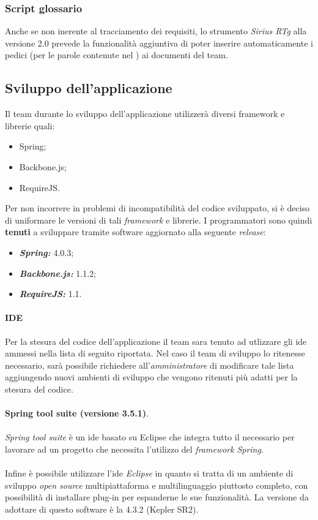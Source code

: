 \subsubsection{Script glossario}
Anche se non inerente al tracciamento dei requisiti, lo strumento \textit{Sirius RTg} alla versione 2.0 prevede la funzionalità aggiuntiva di poter inserire automaticamente i pedici  (per le parole contenute nel \Glossario{}) ai documenti del team.
\subsection{Sviluppo dell'applicazione}
Il team \gruppo{} durante lo sviluppo dell'applicazione utilizzerà diversi framework e librerie quali:

\begin{itemize}
\item Spring;
\item Backbone.js;
\item RequireJS.
\end{itemize}

Per non incorrere in problemi di incompatibilità del codice sviluppato, si è deciso di uniformare le versioni di tali \textit{framework} e librerie.
I programmatori sono quindi \textbf{tenuti} a sviluppare tramite software aggiornato alla seguente \textit{release}:
\begin{itemize}
\item \textbf{\textit{Spring:}} 4.0.3;
\item \textbf{\textit{Backbone.js:}} 1.1.2;
\item \textbf{\textit{RequireJS:}} 1.1.
\end{itemize}


\paragraph{IDE}
Per la stesura del codice dell'applicazione \progetto{} il team \gruppo{} sara tenuto ad utlizzare gli ide ammessi nella lista di seguito riportata. Nel caso il team di sviluppo lo ritenesse necessario, sarà possibile richiedere all'\textit{amministratore} di modificare tale lista aggiungendo nuovi ambienti di sviluppo che vengono ritenuti più adatti per la stesura del codice.
\\
\\
\textbf{Spring tool suite (versione 3.5.1)}.
\\
\\
\textit{Spring tool suite} è un ide basato su Eclipse che integra tutto il necessario per lavorare ad un progetto che necessita l'utilizzo del \textit{framework} \textit{Spring}.
\\
\\
Infine è possibile utilizzare l'ide \textit{Eclipse} in quanto si tratta di un ambiente di sviluppo \textit{open source} multipiattaforma e multilinguaggio piuttosto completo, con possibilità di installare plug-in per espanderne le sue funzionalità.
La versione da adottare di questo software è la 4.3.2 (Kepler SR2).


